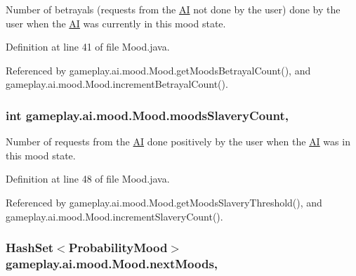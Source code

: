 Number of betrayals (requests from the \hyperlink{a00001}{A\-I} not done by the user) done by the user when the \hyperlink{a00001}{A\-I} was currently in this mood state. 



Definition at line 41 of file Mood.\-java.



Referenced by gameplay.\-ai.\-mood.\-Mood.\-get\-Moods\-Betrayal\-Count(), and gameplay.\-ai.\-mood.\-Mood.\-increment\-Betrayal\-Count().

\hypertarget{a00015_a0bfc4bebdf6767b8c32e747ec21da39e}{
\subsubsection[{moods\-Slavery\-Count}]{\setlength{\rightskip}{0pt plus 5cm}int gameplay.\-ai.\-mood.\-Mood.\-moods\-Slavery\-Count\hspace{0.3cm}{\ttfamily [protected]}, {\ttfamily [inherited]}}}\label{a00015_a0bfc4bebdf6767b8c32e747ec21da39e}


Number of requests from the \hyperlink{a00001}{A\-I} done positively by the user when the \hyperlink{a00001}{A\-I} was in this mood state. 



Definition at line 48 of file Mood.\-java.



Referenced by gameplay.\-ai.\-mood.\-Mood.\-get\-Moods\-Slavery\-Threshold(), and gameplay.\-ai.\-mood.\-Mood.\-increment\-Slavery\-Count().

\hypertarget{a00015_af19cdc9b24293b9d7898d66720b8e0e7}{
\subsubsection[{next\-Moods}]{\setlength{\rightskip}{0pt plus 5cm}Hash\-Set$<${\bf Probability\-Mood}$>$ gameplay.\-ai.\-mood.\-Mood.\-next\-Moods\hspace{0.3cm}{\ttfamily [protected]}, {\ttfamily [inherited]}}}\label{a00015_af19cdc9b24293b9d7898d66720b8e0e7}


